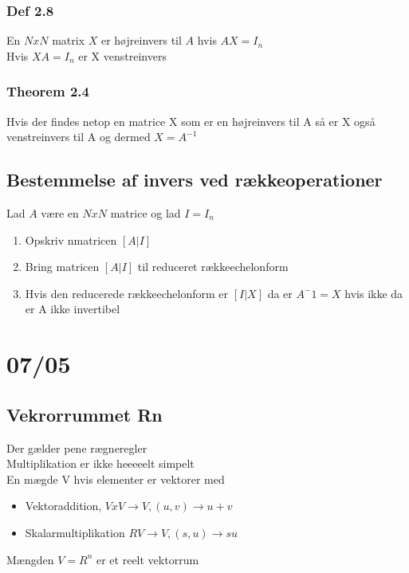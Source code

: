 \documentclass[a4paper,fleqn]{report}
\begin{document}
	\subsection{Def 2.8}
	En $N x N$ matrix $X$ er højreinvers til $A$ hvis $AX = I_n$\\
	Hvis $XA = I_n$ er X venstreinvers\\

	\subsection{Theorem 2.4}
	Hvis der findes netop en matrice X som er en højreinvers til A så er X også venstreinvers
	til A og dermed $X = A^{-1}$

	\section{Bestemmelse af invers ved rækkeoperationer}
	Lad $A$ være en $N x N$ matrice og lad $I = I_n$\\
	\begin{enumerate}
		\item Opskriv nmatricen $[A|I]$
		\item Bring matricen $[A|I]$ til reduceret rækkeechelonform
		\item Hvis den reducerede rækkeechelonform er $[I|X]$ da er $A^-1 = X$ hvis ikke 
			da er A ikke invertibel
	\end{enumerate}
	
	\chapter{07/05}
	\section{Vekrorrummet Rn}
	Der gælder pene rægneregler\\
	Multiplikation er ikke heeeeelt simpelt\\

	En mægde V hvis elementer er vektorer med\\
	\begin{itemize}
		\item Vektoraddition, $V x V \rightarrow V, (u,v) \rightarrow u + v$
		\item Skalarmultiplikation $R  V \rightarrow V, (s,u) \rightarrow su$
	\end{itemize}
	Mængden $V = R^n$ er et reelt vektorrum\\
\end{document}
